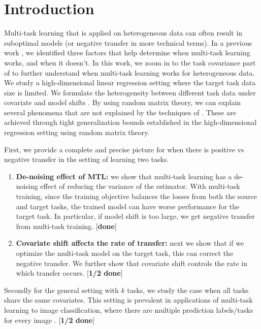 \section{Introduction}

Multi-task learning that is applied on heterogeneous data can often result in suboptimal models (or negative transfer in more technical terms).
In a previous work \cite{WZR20}, we identified three factors that help determine when multi-task learning works, and when it doesn't.
In this work, we zoom in to the task covariance part of \cite{WZR20} to further understand when multi-task learning works for heterogeneous data.
We study a high-dimensional linear regression setting where the target task data size is limited.
We formulate the heterogeneity between different task data under covariate and model shifts \cite{PY09,K18}.
By using random matrix theory, we can explain several phenomena that are not explained by the techniques of \cite{WZR20}.
These are achieved through tight generalization bounds established in the high-dimensional regression setting using random matrix theory.

First, we provide a complete and precise picture for when there is positive vs negative transfer in the setting of learning two tasks.
\begin{enumerate}
	\item {\bf De-noising effect of MTL:} we show that multi-task learning has a de-noising effect of reducing the variance of the estimator.
	With multi-task training, since the training objective balances the losses from both the source and target tasks, the trained model can have worse performance for the target task.
	In particular, if model shift is too large, we get negative transfer from multi-task training. [\textbf{done}]
	\item {\bf Covariate shift affects the rate of transfer:} next we show that if we optimize the multi-task model on the target task, this can correct the negative transfer.
	We further show that covariate shift controls the rate in which transfer occurs. [\textbf{1/2 done}]
\end{enumerate}

Secondly for the general setting with $k$ tasks, we study the case when all tasks share the same covariates.
This setting is prevalent in applications of multi-task learning to image classification, where there are multiple prediction labels/tasks for every image \cite{EA20}.
 [\textbf{1/2 done}]


